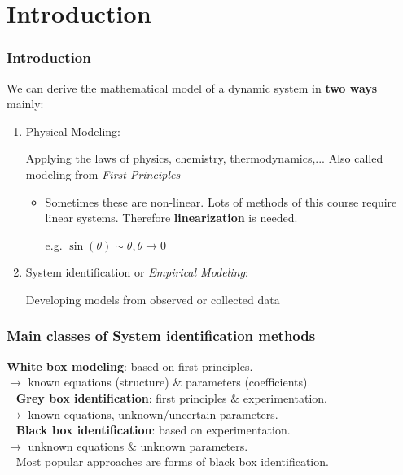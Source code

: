 \section{Introduction}
\begin{frame}
	\frametitle{Introduction}
	We can derive the mathematical model of a dynamic system in \textbf{two ways} mainly:
	\begin{enumerate}
		\item Physical Modeling: 
		
		Applying the laws of physics, chemistry, thermodynamics,...
		Also called modeling from \emph{First Principles}
		
		\begin{itemize}
			\item Sometimes these are non-linear. Lots of methods of this course require linear systems. Therefore \textbf{linearization} is  needed.
			
			\hspace{1cm} e.g. $\sin(\theta) \sim \theta, \theta \rightarrow 0$
		\end{itemize}
		\pause 
		
		\item  System identification or \emph{Empirical Modeling}:
		
		Developing models from observed or collected data
		
	\end{enumerate}
	
\end{frame}

\begin{frame}
	\frametitle{Main classes of System identification methods}
	\textbf{White box modeling}: based on first principles. \\
	$\rightarrow$ known equations (structure) $\&$ parameters (coefficients). \\
	\ \newline
	\pause
	\textbf{Grey box identification}: first principles $\&$ experimentation. \\
	$\rightarrow$ known equations, unknown/uncertain parameters. \\
	\ \newline
	\pause
	\textbf{Black box identification}: based on experimentation. \\
	$\rightarrow$ unknown equations $\&$ unknown parameters. \\
	\ \newline
	\pause
	Most popular approaches are forms of black box identification.
\end{frame}


